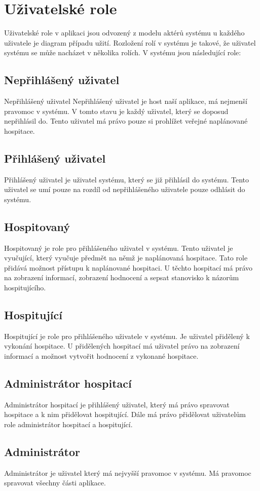 \section{Uživatelské role}
Uživatelské role v aplikaci jsou odvozený z modelu aktérů systému u každého uživatele je diagram případu užití. Rozložení rolí v systému je takové, že uživatel systému se může nacházet v několika rolích. V systému jsou následující role:
\subsection{Nepřihlášený uživatel}
Nepřihlášený uživatel Nepřihlášený uživatel je host naší aplikace, má nejmenší pravomoc v systému. V tomto stavu je každý uživatel, který se doposud nepřihlásil do. Tento uživatel má právo pouze si prohlížet veřejné naplánované hospitace.
\subsection{Přihlášený uživatel}
Přihlášený uživatel je uživatel systému, který se již přihlásil do systému. Tento uživatel se umí pouze na rozdíl od nepřihlášeného uživatele pouze odhlásit do systému.
\subsection{Hospitovaný}
Hospitovaný je role pro přihlášeného uživatel v systému. Tento uživatel je vyučující, který vyučuje předmět na němž je naplánovaná hospitace. Tato role přidává možnost přístupu k naplánované hospitaci. U těchto hospitací má právo na zobrazení informací, zobrazení hodnocení a sepsat stanovisko k názorům hospitujícího.
\subsection{Hospitující}
Hospitující je role pro přihlášeného uživatele v systému. Je uživatel přidělený k vykonání hospitace. U přidělených hospitací má uživatel právo na zobrazení informací a možnost vytvořit hodnocení z vykonané hospitace.
\subsection{Administrátor hospitací}
Administrátor hospitací je přihlášený uživatel, který má právo spravovat hospitace a k nim přidělovat hospitující. Dále má právo přidělovat uživatelům role administrátor hospitací a hospitující.
\subsection{Administrátor}
Administrátor je uživatel který má nejvyšší pravomoc v systému. Má pravomoc spravovat všechny části aplikace. 

